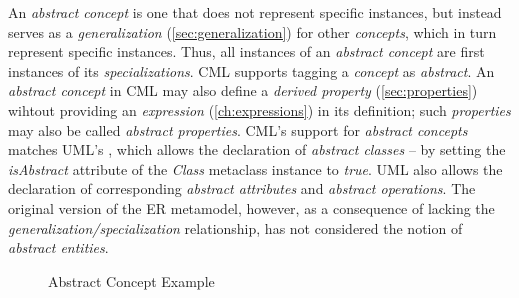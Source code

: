 \begin{definition}
An \emph{abstract concept} is one that does not represent specific instances,
but instead serves as a \emph{generalization} (\ref{sec:generalization}) 
for other \emph{concepts},
which in turn represent specific instances.
Thus, all instances of an \emph{abstract concept}
are first instances of its \emph{specializations}.
CML supports tagging a \emph{concept} as \emph{abstract}.
An \emph{abstract concept} in CML may also define a \emph{derived property} (\ref{sec:properties})
wihtout providing an \emph{expression} (\ref{ch:expressions}) in its definition;
such \emph{properties} may also be called \emph{abstract properties}.
CML's support for \emph{abstract concepts} matches UML's \cite{uml},
which allows the declaration of \emph{abstract classes}
-- by setting the \emph{isAbstract} attribute of the \emph{Class} metaclass instance to \emph{true}.
UML also allows the declaration of corresponding \emph{abstract attributes} and \emph{abstract operations}.
The original version of the ER \cite{er} metamodel, however,
as a consequence of lacking the \emph{generalization/specialization} relationship,
has not considered the notion of \emph{abstract entities}.
\end{definition}

\begin{figure}
\verbatimfont{\small}

\caption{Abstract Concept Example}
\label{fig:ex:generalization}
\end{figure}
